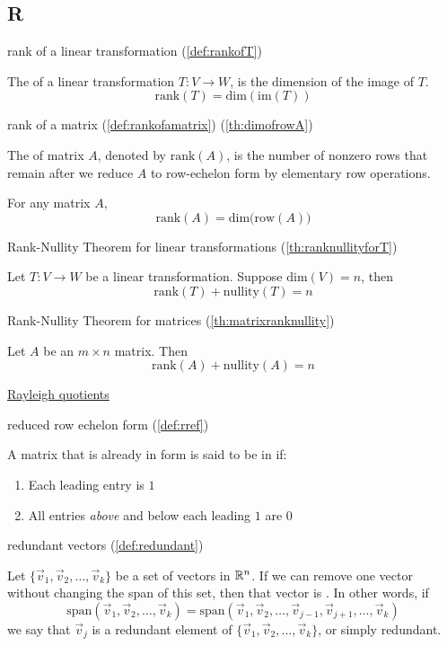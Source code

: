 \documentclass{ximera}
\begin{document}
\subsection{R}


rank of a linear transformation (\ref{def:rankofT})
\begin{expandable}
    The  of a linear transformation $T:V\rightarrow W$, is the dimension of the image of $T$.
$$\mbox{rank}(T)=\mbox{dim}(\mbox{im}(T))$$
\end{expandable}

rank of a matrix (\ref{def:rankofamatrix}) (\ref{th:dimofrowA})
\begin{expandable}
    The  of matrix $A$, denoted by $\mbox{rank}(A)$, is the number of nonzero rows that remain after we reduce $A$ to row-echelon form by elementary row operations.

    For any matrix $A$,  
$$\mbox{rank}(A)=\mbox{dim}\Big(\mbox{row}(A)\Big)$$

\end{expandable}

Rank-Nullity Theorem for linear transformations (\ref{th:ranknullityforT})
\begin{expandable}
    Let $T:V\rightarrow W$ be a linear transformation.  Suppose $\mbox{dim}(V)=n$, then
$$\mbox{rank}(T)+\mbox{nullity}(T)=n$$
\end{expandable}

Rank-Nullity Theorem for matrices (\ref{th:matrixranknullity})
\begin{expandable}
    Let $A$ be an $m\times n$ matrix.  Then 
$$\mbox{rank}(A)+\mbox{nullity}(A)=n$$
\end{expandable}

\href{https://ximera.osu.edu/oerlinalg/LinearAlgebra/EIG-0070/main}{Rayleigh quotients}

reduced row echelon form (\ref{def:rref})
\begin{expandable}
    A matrix that is already in  form is said to be in  if:
\begin{enumerate}
\item Each leading entry is $1$
\item All entries {\it above} and below each leading $1$ are $0$
\end{enumerate}
\end{expandable}

redundant vectors (\ref{def:redundant})
\begin{expandable}
    Let $\{\vec{v}_1,\vec{v}_2,\dots,\vec{v}_k\}$ be a set of vectors in $\mathbb{R}^n$.  If we can remove one vector without changing the span of this set, then that vector is .  In other words, if $$\mbox{span}\left(\vec{v}_1,\vec{v}_2,\dots,\vec{v}_k\right)=\mbox{span}\left(\vec{v}_1,\vec{v}_2,\dots,\vec{v}_{j-1},\vec{v}_{j+1},\dots,\vec{v}_k\right)$$ we say that $\vec{v}_j$ is a redundant element of $\{\vec{v}_1,\vec{v}_2,\dots,\vec{v}_k\}$, or simply redundant.
\end{expandable}
\end{document}
